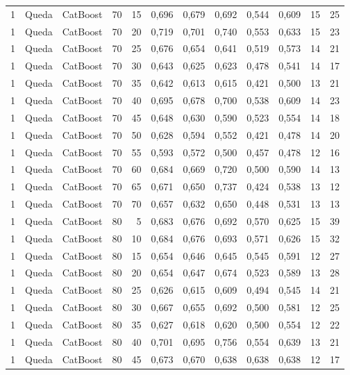 \begin{longtable}{@{}rllrrrrrrrrr@{}}
1 & Queda & CatBoost & 70 & 15 & 0,696 & 0,679 & 0,692 & 0,544 & 0,609 & 15 & 25 \\
1 & Queda & CatBoost & 70 & 20 & 0,719 & 0,701 & 0,740 & 0,553 & 0,633 & 15 & 23 \\
1 & Queda & CatBoost & 70 & 25 & 0,676 & 0,654 & 0,641 & 0,519 & 0,573 & 14 & 21 \\
1 & Queda & CatBoost & 70 & 30 & 0,643 & 0,625 & 0,623 & 0,478 & 0,541 & 14 & 17 \\
1 & Queda & CatBoost & 70 & 35 & 0,642 & 0,613 & 0,615 & 0,421 & 0,500 & 13 & 21 \\
1 & Queda & CatBoost & 70 & 40 & 0,695 & 0,678 & 0,700 & 0,538 & 0,609 & 14 & 23 \\
1 & Queda & CatBoost & 70 & 45 & 0,648 & 0,630 & 0,590 & 0,523 & 0,554 & 14 & 18 \\
1 & Queda & CatBoost & 70 & 50 & 0,628 & 0,594 & 0,552 & 0,421 & 0,478 & 14 & 20 \\
1 & Queda & CatBoost & 70 & 55 & 0,593 & 0,572 & 0,500 & 0,457 & 0,478 & 12 & 16 \\
1 & Queda & CatBoost & 70 & 60 & 0,684 & 0,669 & 0,720 & 0,500 & 0,590 & 14 & 13 \\
1 & Queda & CatBoost & 70 & 65 & 0,671 & 0,650 & 0,737 & 0,424 & 0,538 & 13 & 12 \\
1 & Queda & CatBoost & 70 & 70 & 0,657 & 0,632 & 0,650 & 0,448 & 0,531 & 13 & 13 \\
1 & Queda & CatBoost & 80 & 5 & 0,683 & 0,676 & 0,692 & 0,570 & 0,625 & 15 & 39 \\
1 & Queda & CatBoost & 80 & 10 & 0,684 & 0,676 & 0,693 & 0,571 & 0,626 & 15 & 32 \\
1 & Queda & CatBoost & 80 & 15 & 0,654 & 0,646 & 0,645 & 0,545 & 0,591 & 12 & 27 \\
1 & Queda & CatBoost & 80 & 20 & 0,654 & 0,647 & 0,674 & 0,523 & 0,589 & 13 & 28 \\
1 & Queda & CatBoost & 80 & 25 & 0,626 & 0,615 & 0,609 & 0,494 & 0,545 & 14 & 21 \\
1 & Queda & CatBoost & 80 & 30 & 0,667 & 0,655 & 0,692 & 0,500 & 0,581 & 12 & 25 \\
1 & Queda & CatBoost & 80 & 35 & 0,627 & 0,618 & 0,620 & 0,500 & 0,554 & 12 & 22 \\
1 & Queda & CatBoost & 80 & 40 & 0,701 & 0,695 & 0,756 & 0,554 & 0,639 & 13 & 21 \\
1 & Queda & CatBoost & 80 & 45 & 0,673 & 0,670 & 0,638 & 0,638 & 0,638 & 12 & 17 \\

\end{longtable}
